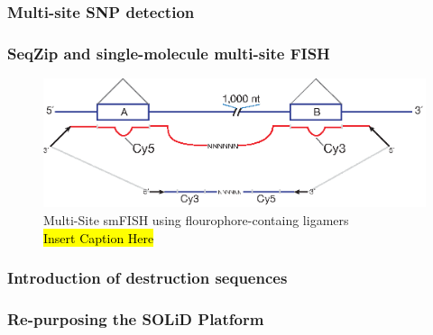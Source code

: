     \subsubsection{Multi-site SNP detection}
      \label{Disc:subsubsec: Multi-site SNP Detection}


    \subsubsection{SeqZip and single-molecule multi-site FISH}
      \label{Disc:subsubsec:SeqZip and Single-Molecule FISH}

      \begin{figure} %
        \centering 
        \includegraphics{Figures/Discussion/MultiSiteFish.eps}
        \caption[Multi-Site smFISH using flourophore-containg ligamers]
        {Multi-Site smFISH using flourophore-containg ligamers \\[0.25cm]
          \hl{Insert Caption Here}
          }
        \label{Disc:fig:MultiSite FISH using SeqZip}
        \end{figure}


    \subsubsection{Introduction of destruction sequences}
      \label{Disc:subsubsec:Intro of Desctruction Sequences}


    \subsubsection{Re-purposing the SOLiD Platform}
      \label{Disc:subsubsec:SOLiD Platform for SeqZip}


